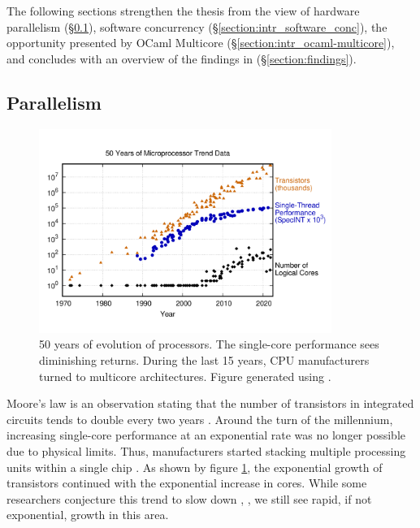 \documentclass[12pt,a4paper,twoside]{report}
\begin{document}
The following sections strengthen the thesis from the view of hardware parallelism (\S\ref{section:intr_hardware_par}), software concurrency (\S\ref{section:intr_software_conc}), the opportunity presented by OCaml Multicore (\S\ref{section:intr_ocaml-multicore}), and concludes with an overview of the findings in (\S\ref{section:findings}).

\subsection{Parallelism}
\label{section:intr_hardware_par}


\begin{figure}[t]
    \centering
    \includegraphics[width=0.85\textwidth]{50-years-processor-trend.png}
    \caption{50 years of evolution of processors. The single-core performance sees diminishing returns. During the last 15 years, CPU manufacturers turned to multicore architectures. Figure generated using \cite{karlrupp48:online}.}
   \label{fig:50yrs}
\end{figure}


Moore's law is an observation stating that the number of transistors in integrated circuits tends to double every two years \cite{Moore2006}. Around the turn of the millennium, increasing single-core performance at an exponential rate was no longer possible due to physical limits. Thus, manufacturers started stacking multiple processing units within a single chip \cite{Geer2005}. As shown by figure \ref{fig:50yrs}, the exponential growth of transistors continued with the exponential increase in cores. While some researchers conjecture this trend to slow down \cite{6307773}, \cite{mooremulti}, we still see rapid, if not exponential, growth in this area.
\end{document}
